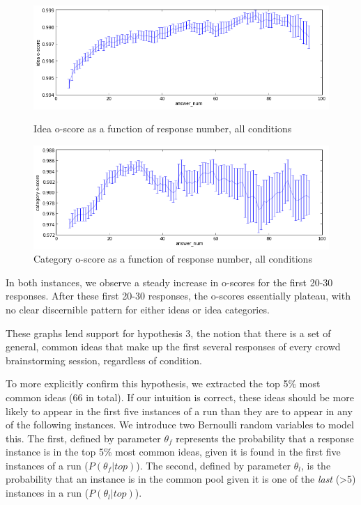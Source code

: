 \begin{figure}[h]
    \centering
    \includegraphics[width=0.9\columnwidth]{idea_oscore_order}
    \caption{Idea o-score as a function of response number, all conditions}
    \includegraphics[width=0.9\columnwidth]{cat_oscore_order}
    \caption{Category o-score as a function of response number, all conditions}
\end{figure}

In both instances, we observe a steady increase in o-scores for the first 20-30 responses. After these first 20-30 responses, the o-scores essentially plateau, with no clear discernible pattern for either ideas or idea categories.

These graphs lend support for hypothesis 3, the notion that there is a set of general, common ideas that make up the first several responses of every crowd brainstorming session, regardless of condition.

To more explicitly confirm this hypothesis, we extracted the top 5\% most common ideas (66 in total). If our intuition is correct, these ideas should be more likely to appear in the first five instances of a run than they are to appear in any of the following instances. We introduce two Bernoulli random variables to model this. The first, defined by parameter $\theta_f$ represents the probability that a response instance is in the top 5\% most common ideas, given it is found in the first five instances of a run ($P(\theta_f|top)$). The second, defined by parameter $\theta_l$, is the probability that an instance is in the common pool given it is one of the \emph{last} (>5) instances in a run ($P(\theta_l|top)$).

